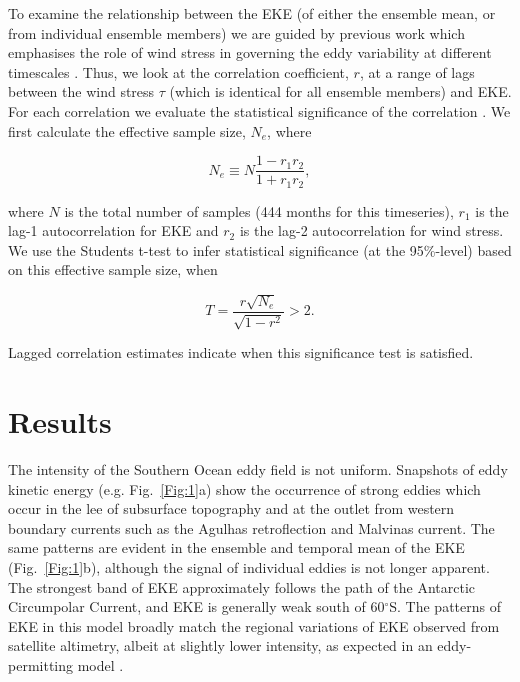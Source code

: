 \documentclass{agujournal2019}
\begin{document}
To examine the relationship between the EKE (of either the ensemble mean, or from individual ensemble members) we are guided by previous work which emphasises the role of wind stress in governing the eddy variability at different timescales \citep[e.g.][]{Hogg2015, Sinha2016}.
Thus, we look at the correlation coefficient, $r$, at a range of lags between the wind stress $\tau$ (which is identical for all ensemble members) and EKE.
For each correlation we evaluate the statistical significance of the correlation \citep[following, e.g.][]{Santer2000}.
We first calculate the effective sample size, $N_e$, where
\begin{linenomath*}
\begin{equation}
N_e \equiv N \frac{1-r_1 r_2}{1+r_1 r_2},
\end{equation}
\end{linenomath*}
where $N$ is the total number of samples (444 months for this timeseries), $r_1$ is the lag-1 autocorrelation for EKE and $r_2$ is the lag-2 autocorrelation for wind stress.
We use the Students t-test to infer statistical significance (at the 95\%-level) based on this effective sample size, when
\begin{linenomath*}
\begin{equation}
T = \frac{r \sqrt{N_e}}{\sqrt{1-r^2}} > 2.
\end{equation}
\end{linenomath*}
Lagged correlation estimates indicate when this significance test is satisfied.

\section{Results}

The intensity of the Southern Ocean eddy field is not uniform.
Snapshots of eddy kinetic energy (e.g. Fig.~\ref{Fig:1}a) show the occurrence of strong eddies which occur in the lee of subsurface topography and at the outlet from western boundary currents such as the Agulhas retroflection and Malvinas current.
The same patterns are evident in the ensemble and temporal mean of the EKE (Fig.~\ref{Fig:1}b), although the signal of individual eddies is not longer apparent.
The strongest band of EKE approximately follows the path of the Antarctic Circumpolar Current, and EKE is generally weak south of 60$^\circ$S.
The patterns of EKE in this model broadly match the regional variations of EKE observed from satellite altimetry, albeit at slightly lower intensity, as expected in an eddy-permitting model \citep[e.g.][]{Kiss2020}.
\end{document}
